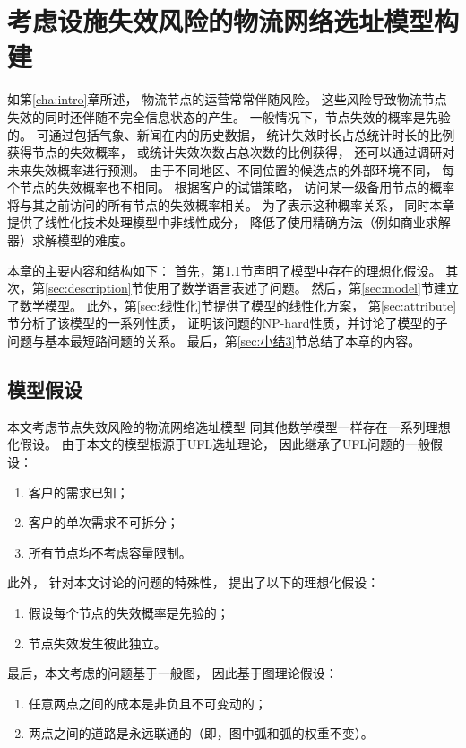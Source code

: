 \setlength{\baselineskip}{20pt}
\chapter{考虑设施失效风险的物流网络选址模型构建}
\label{cha:model}

如第\ref{cha:intro}章所述，
物流节点的运营常常伴随风险。
这些风险导致物流节点失效的同时还伴随不完全信息状态的产生。
一般情况下，节点失效的概率是先验的。
可通过包括气象、新闻在内的历史数据，
统计失效时长占总统计时长的比例获得节点的失效概率，
或统计失效次数占总次数的比例获得，
还可以通过调研对未来失效概率进行预测。
由于不同地区、不同位置的候选点的外部环境不同，
每个节点的失效概率也不相同。
根据客户的试错策略，
访问某一级备用节点的概率将与其之前访问的所有节点的失效概率相关。
为了表示这种概率关系，
同时本章提供了线性化技术处理模型中非线性成分，
降低了使用精确方法（例如商业求解器）求解模型的难度。

本章的主要内容和结构如下：
首先，第\ref{sec:suppose}节声明了模型中存在的理想化假设。
其次，第\ref{sec:description}节使用了数学语言表述了问题。
然后，第\ref{sec:model}节建立了数学模型。
此外，第\ref{sec:线性化}节提供了模型的线性化方案，
第\ref{sec:attribute}节分析了该模型的一系列性质，
证明该问题的NP-hard性质，并讨论了模型的子问题与基本最短路问题的关系。
最后，第\ref{sec:小结3}节总结了本章的内容。

\section{模型假设}
\label{sec:suppose}
本文考虑节点失效风险的物流网络选址模型
同其他数学模型一样存在一系列理想化假设。
由于本文的模型根源于UFL选址理论，
因此继承了UFL问题的一般假设：
\begin{enumerate}[label=(\arabic*),leftmargin=0pt,itemindent=3.5\ccwd, nosep]
  \item 客户的需求已知；
  \item 客户的单次需求不可拆分；
  \item 所有节点均不考虑容量限制。
\end{enumerate}
此外，
针对本文讨论的问题的特殊性，
提出了以下的理想化假设：
\begin{enumerate}[label=(\arabic*),leftmargin=0pt,itemindent=3.5\ccwd, nosep, resume]
  \item 假设每个节点的失效概率是先验的；
  \item 节点失效发生彼此独立。
\end{enumerate}
最后，本文考虑的问题基于一般图，
因此基于图理论假设：
\begin{enumerate}[label=(\arabic*),leftmargin=0pt,itemindent=3.5\ccwd, nosep, resume]
  \item 任意两点之间的成本是非负且不可变动的；
  \item 两点之间的道路是永远联通的（即，图中弧和弧的权重不变）。
\end{enumerate}

